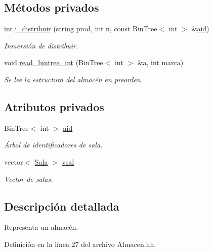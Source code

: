 \subsection*{Métodos privados}
\begin{DoxyCompactItemize}
\item 
int \hyperlink{class_almacen_a43e976815927fb9ce06938889d585937}{i\+\_\+distribuir} (string prod, int n, const Bin\+Tree$<$ int $>$ \&\hyperlink{class_almacen_a0800dd9ff516f710e4cff89b6f5d5a4a}{aid})
\begin{DoxyCompactList}\small\item\em Inmersión de distribuir. \end{DoxyCompactList}\item 
void \hyperlink{class_almacen_a16c293b757e28baf6abb9ba926d70c66}{read\+\_\+bintree\+\_\+int} (Bin\+Tree$<$ int $>$ \&a, int marca)
\begin{DoxyCompactList}\small\item\em Se lee la estructura del almacén en preorden. \end{DoxyCompactList}\end{DoxyCompactItemize}
\subsection*{Atributos privados}
\begin{DoxyCompactItemize}
\item 
Bin\+Tree$<$ int $>$ \hyperlink{class_almacen_a0800dd9ff516f710e4cff89b6f5d5a4a}{aid}
\begin{DoxyCompactList}\small\item\em Árbol de identificadores de sala. \end{DoxyCompactList}\item 
vector$<$ \hyperlink{class_sala}{Sala} $>$ \hyperlink{class_almacen_acae00c6ee986edf2a66b07987896b495}{vsal}
\begin{DoxyCompactList}\small\item\em Vector de salas. \end{DoxyCompactList}\end{DoxyCompactItemize}


\subsection{Descripción detallada}
Representa un almacén. 

Definición en la línea 27 del archivo Almacen.\+hh.




